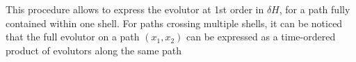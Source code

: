 \documentclass{article}
\newcommand{\de}[0]{\text{d}}
\begin{document}
%
%
This procedure allows to express the evolutor at 1st order in $\delta H$, for a path fully contained within one shell. For paths crossing multiple shells, it can be noticed~\cite{Lisi:1997yc} that the full evolutor on a path $(x_1,x_2)$ can be expressed as a time-ordered product of evolutors along the same path
\end{document}
